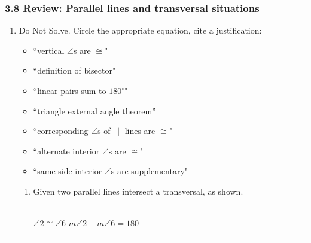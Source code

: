 

\fancyhead[LE]{\thepage}



\subsubsection*{3.8 Review: Parallel lines and transversal situations}
\begin{enumerate}
\item Do Not Solve. Circle the appropriate equation, cite a  justification:
  \begin{multicols}{2}
    \begin{itemize} 
      \item ``vertical $\angle$s are $\cong$" 
      \item ``definition of bisector" 
      \item ``linear pairs sum to $180^\circ$" 
      \item ``triangle external angle theorem''
      \item ``corresponding $\angle$s of $\parallel$ lines are $\cong$" 
      \item ``alternate interior $\angle$s are $\cong$"
      \item ``same-side interior $\angle$s are supplementary"
    \end{itemize}
  \end{multicols}
  \begin{enumerate}

    \item Given two parallel lines intersect a transversal, as shown. \hspace{1.5cm}
     \\[0.5cm]
    $\angle 2 \cong \angle 6$ \hspace{1cm} $m\angle 2 + m\angle 6 =  180$ \hspace{0.5cm} \rule{6cm}{0.15mm}
  

\end{enumerate}
\end{enumerate}
